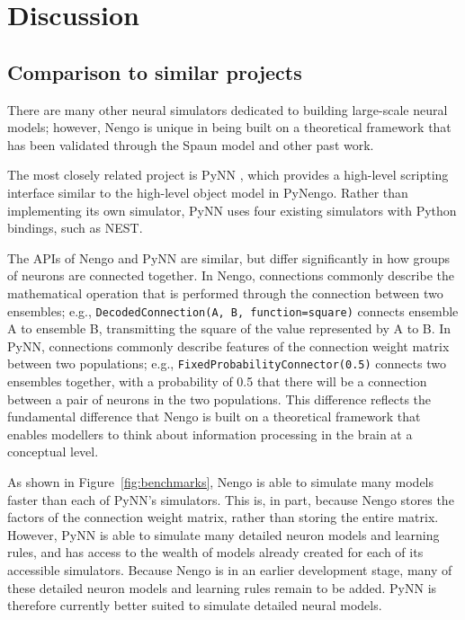 \documentclass{frontiersSCNS}
\begin{document}
\section{Discussion}

\subsection{Comparison to similar projects}

There are many other neural simulators
dedicated to building large-scale neural models;
however, Nengo is unique in being built
on a theoretical framework
that has been validated
through the Spaun model and other past work.

The most closely related project is PyNN
\citep{davison2008},
which provides a high-level scripting
interface similar to the
high-level object model in PyNengo.
Rather than implementing its
own simulator, PyNN uses four existing
simulators with Python bindings,
such as NEST.

The APIs of Nengo and PyNN are similar,
but differ significantly
in how groups of neurons are connected together.
In Nengo, connections commonly describe
the mathematical operation that is performed
through the connection between
two ensembles;
e.g., \texttt{DecodedConnection(A, B,
function=square)} connects ensemble A
to ensemble B, transmitting the square of
the value represented by A to B.
In PyNN, connections commonly describe
features of the connection weight matrix
between two populations;
e.g., \texttt{FixedProbabilityConnector(0.5)}
connects two ensembles together,
with a probability of 0.5
that there will be a connection
between a pair of neurons in the two populations.
This difference reflects the
fundamental difference that Nengo
is built on a theoretical framework
that enables modellers to think
about information processing in the brain
at a conceptual level.

As shown in Figure~\ref{fig:benchmarks},
Nengo is able to simulate many models
faster than each of PyNN's simulators.
This is, in part,
because Nengo stores the factors
of the connection weight matrix,
rather than storing the entire matrix.
However, PyNN is able to simulate
many detailed neuron models
and learning rules,
and has access to the wealth of models
already created for each of its
accessible simulators.
Because Nengo is in an earlier development stage,
many of these detailed neuron models
and learning rules remain to be added.
PyNN is therefore currently better suited to
simulate detailed neural models.
\end{document}
